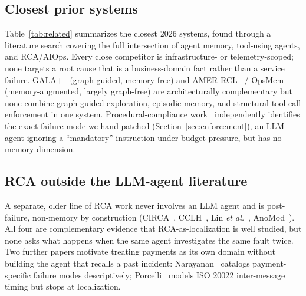 \documentclass[conference]{IEEEtran}
\begin{document}
\subsection{Closest prior systems}

Table~\ref{tab:related} summarizes the closest 2026 systems, found through a literature search covering the
full intersection of agent memory, tool-using agents, and RCA/AIOps. Every close competitor is infrastructure-
or telemetry-scoped; none targets a root cause that is a business-domain fact rather than a service failure.
GALA+~\cite{gala} (graph-guided, memory-free) and AMER-RCL~\cite{amerrcl} / OpsMem~\cite{opsmem}
(memory-augmented, largely graph-free) are architecturally complementary but none combine graph-guided
exploration, episodic memory, and structural tool-call enforcement in one system. Procedural-compliance
work~\cite{agentltl} independently identifies the exact failure mode we hand-patched
(Section~\ref{sec:enforcement}), an LLM agent ignoring a ``mandatory'' instruction under budget pressure, but
has no memory dimension.

\subsection{RCA outside the LLM-agent literature}

A separate, older line of RCA work never involves an LLM agent and is post-failure, non-memory by construction
(CIRCA~\cite{circa}, CCLH~\cite{cclh}, Lin \textit{et al.}~\cite{fastdim}, AnoMod~\cite{anomod}). All four are
complementary evidence that RCA-as-localization is well studied, but none asks what happens when the same agent
investigates the same fault twice. Two further papers motivate treating payments as its own domain without building the
agent that recalls a past incident: Narayanan~\cite{hiddenfailuremodes} catalogs payment-specific failure modes
descriptively; Porcelli~\cite{tips} models ISO 20022 inter-message timing but stops at localization.
\end{document}
